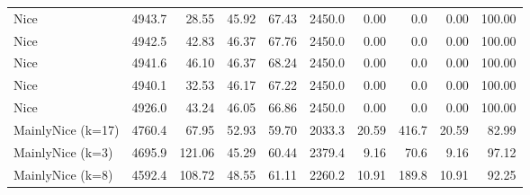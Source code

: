 \documentclass[journal,a4paper,10pt,twoside]{IEEEtran} %
\begin{document}
\begin{table}[ht]
\begin{tabular}{l|rrrr|rrrrr}
		Nice              & 4943.7 &  28.55 &  45.92 &   67.43 & 2450.0 &                   0.00 &    0.0 &                    0.00 &   100.00 \\
		Nice              & 4942.5 &  42.83 &  46.37 &   67.76 & 2450.0 &                   0.00 &    0.0 &                    0.00 &   100.00 \\
		Nice              & 4941.6 &  46.10 &  46.37 &   68.24 & 2450.0 &                   0.00 &    0.0 &                    0.00 &   100.00 \\
		Nice              & 4940.1 &  32.53 &  46.17 &   67.22 & 2450.0 &                   0.00 &    0.0 &                    0.00 &   100.00 \\
		Nice              & 4926.0 &  43.24 &  46.05 &   66.86 & 2450.0 &                   0.00 &    0.0 &                    0.00 &   100.00 \\
		MainlyNice (k=17) & 4760.4 &  67.95 &  52.93 &   59.70 & 2033.3 &                  20.59 &  416.7 &                   20.59 &    82.99 \\
		MainlyNice (k=3)  & 4695.9 & 121.06 &  45.29 &   60.44 & 2379.4 &                   9.16 &   70.6 &                    9.16 &    97.12 \\
		MainlyNice (k=8)  & 4592.4 & 108.72 &  48.55 &   61.11 & 2260.2 &                  10.91 &  189.8 &                   10.91 &    92.25 \\ \bottomrule
	\end{tabular}
\end{table}
\end{document}
